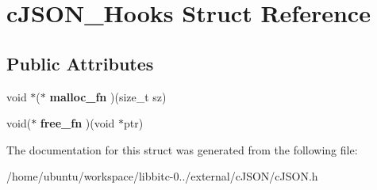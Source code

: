 \hypertarget{structcJSON__Hooks}{\section{c\-J\-S\-O\-N\-\_\-\-Hooks Struct Reference}
\label{structcJSON__Hooks}
}
\subsection*{Public Attributes}
\begin{DoxyCompactItemize}
\item 
\hypertarget{structcJSON__Hooks_a55ba326511f34ee6e380286c9dcf4a25}{void $\ast$($\ast$ {\bfseries malloc\-\_\-fn} )(size\-\_\-t sz)}\label{structcJSON__Hooks_a55ba326511f34ee6e380286c9dcf4a25}

\item 
\hypertarget{structcJSON__Hooks_a97927334c2456b8555df5b4568ef28fc}{void($\ast$ {\bfseries free\-\_\-fn} )(void $\ast$ptr)}\label{structcJSON__Hooks_a97927334c2456b8555df5b4568ef28fc}

\end{DoxyCompactItemize}


The documentation for this struct was generated from the following file\-:\begin{DoxyCompactItemize}
\item 
/home/ubuntu/workspace/libbitc-\/0../external/c\-J\-S\-O\-N/c\-J\-S\-O\-N.\-h\end{DoxyCompactItemize}
